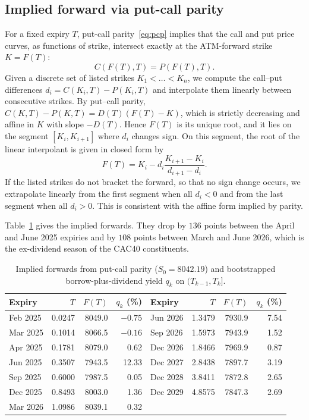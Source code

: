 \documentclass[11pt,a4paper]{article}
\theoremstyle{plain}
\theoremstyle{definition}
\begin{document}
\subsection{Implied forward via put-call parity}
For a fixed expiry $T$, put-call parity~\eqref{eq:pcp} implies that the call and put price curves, as functions of strike, intersect exactly at the ATM-forward strike $K = F(T)$:
\begin{equation}
    C(F(T), T) = P(F(T), T).
    \label{eq:atmforward}
\end{equation}
Given a discrete set of listed strikes $K_1 < \dots < K_n$, we compute the call–put differences $d_i = C(K_i,T) - P(K_i,T)$ and interpolate them linearly between consecutive strikes. By put–call parity, $C(K,T) - P(K,T) = D(T)(F(T) - K)$, which is strictly decreasing and affine in $K$ with slope $-D(T)$. Hence $F(T)$ is its unique root, and it lies on the segment $[K_i, K_{i+1}]$ where $d_i$ changes sign. On this segment, the root of the linear interpolant is given in closed form by
$$F(T) = K_i - d_i\frac{K_{i+1} - K_i}{d_{i+1} - d_i}.$$
If the listed strikes do not bracket the forward, so that no sign change occurs, we extrapolate linearly from the first segment when all $d_i < 0$ and from the last segment when all $d_i > 0$. This is consistent with the affine form implied by parity.

Table~\ref{tab:forwards} gives the implied forwards. They drop by $136$ points between the April and June 2025 expiries and by $108$ points between March and June 2026, which is the ex-dividend season of the CAC40 constituents.

\begin{table}[htbp]
\centering
\small
\begin{tabular}{@{}lrrrlrrr@{}}
\toprule
Expiry & $T$ & $F(T)$ & $q_k$ (\%) & Expiry & $T$ & $F(T)$ & $q_k$ (\%) \\
\midrule
Feb 2025 & 0.0247 & 8049.0 & $-0.75$ & Jun 2026 & 1.3479 & 7930.9 & 7.54 \\
Mar 2025 & 0.1014 & 8066.5 & $-0.16$ & Sep 2026 & 1.5973 & 7943.9 & 1.52 \\
Apr 2025 & 0.1781 & 8079.0 & 0.62 & Dec 2026 & 1.8466 & 7969.9 & 0.87 \\
Jun 2025 & 0.3507 & 7943.5 & 12.33 & Dec 2027 & 2.8438 & 7897.7 & 3.19 \\
Sep 2025 & 0.6000 & 7987.5 & 0.05 & Dec 2028 & 3.8411 & 7872.8 & 2.65 \\
Dec 2025 & 0.8493 & 8003.0 & 1.36 & Dec 2029 & 4.8575 & 7847.3 & 2.69 \\
Mar 2026 & 1.0986 & 8039.1 & 0.32 & & & & \\
\bottomrule
\end{tabular}
\caption{Implied forwards from put-call parity ($S_0=8042.19$) and bootstrapped borrow-plus-dividend yield $q_k$ on $(T_{k-1},T_k]$.}
\label{tab:forwards}
\end{table}
\end{document}
